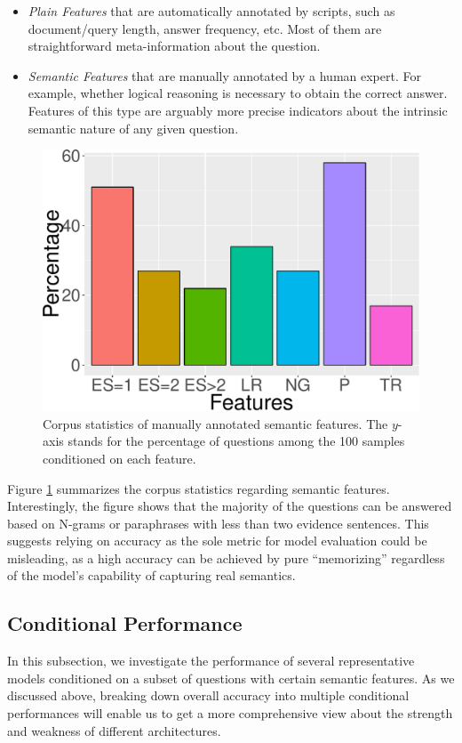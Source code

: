 \documentclass[11pt,a4paper]{article}
\begin{document}
\begin{itemize}
\item \emph{Plain Features} that are automatically annotated by scripts, such as document/query length, answer frequency, etc. Most of them are straightforward meta-information about the question.
\item \emph{Semantic Features} that are manually annotated by a human expert. For example, whether logical reasoning is necessary to obtain the correct answer. Features of this type are arguably more precise indicators about the intrinsic semantic nature of any given question.
\end{itemize}

\begin{figure}[t]
\centering
\includegraphics[width=0.7\linewidth]{semantic-feature-stats.pdf}
\caption{Corpus statistics of manually annotated semantic features.
The $y$-axis stands for the percentage of questions among the 100 samples conditioned on each feature.}
\label{fig:sf-stats}
\end{figure}

Figure \ref{fig:sf-stats} summarizes the corpus statistics regarding semantic features. Interestingly, the figure shows that the majority of the questions can be answered based on N-grams or paraphrases with less than two evidence sentences. This suggests relying on accuracy as the sole metric for model evaluation could be misleading, as a high accuracy can be achieved by pure ``memorizing'' regardless of the model's capability of capturing real semantics.

\subsection{Conditional Performance}
In this subsection, we investigate the performance of several representative models conditioned on a subset of questions with certain semantic features. As we discussed above, breaking down overall accuracy into multiple conditional performances will enable us to get a more comprehensive view about the strength and weakness of different architectures.
\end{document}
